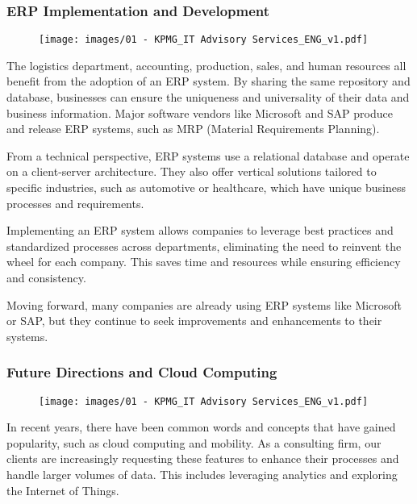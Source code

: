 \subsubsection{ERP Implementation and
  Development}\label{erp-implementation-and-development}

\begin{figure}[!h]
  \centering
  \texttt{[image: images/01 - KPMG\_IT Advisory Services\_ENG\_v1.pdf]}
\end{figure}

The logistics department, accounting, production, sales, and human
resources all benefit from the adoption of an ERP system. By sharing the
same repository and database, businesses can ensure the uniqueness and
universality of their data and business information. Major software
vendors like Microsoft and SAP produce and release ERP systems, such as
MRP (Material Requirements Planning).

From a technical perspective, ERP systems use a relational database and
operate on a client-server architecture. They also offer vertical
solutions tailored to specific industries, such as automotive or
healthcare, which have unique business processes and requirements.

Implementing an ERP system allows companies to leverage best practices
and standardized processes across departments, eliminating the need to
reinvent the wheel for each company. This saves time and resources while
ensuring efficiency and consistency.

Moving forward, many companies are already using ERP systems like
Microsoft or SAP, but they continue to seek improvements and
enhancements to their systems.

\subsubsection{Future Directions and Cloud
  Computing}\label{future-directions-and-cloud-computing}

\begin{figure}[!h]
  \centering
  \texttt{[image: images/01 - KPMG\_IT Advisory Services\_ENG\_v1.pdf]}
\end{figure}

In recent years, there have been common words and concepts that have
gained popularity, such as cloud computing and mobility. As a consulting
firm, our clients are increasingly requesting these features to enhance
their processes and handle larger volumes of data. This includes
leveraging analytics and exploring the Internet of Things.

